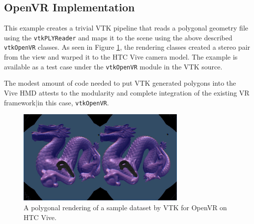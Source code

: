 
\subsection{OpenVR Implementation}

This example creates a trivial VTK pipeline that reads a polygonal geometry file
using the \texttt{vtkPLYReader} and maps it to the scene using the above described \texttt{vtkOpenVR}
classes. As seen in Figure \ref{fig:openvrdragon}, the rendering
classes created a stereo pair from the view and warped it to the HTC Vive camera model. 
The example is available as a test case under the
\texttt{vtkOpenVR} module in the VTK source.

The modest amount of code needed to put VTK generated polygons into the
Vive HMD attests to the modularity and complete integration of the
existing VR framework|in this case, \texttt{vtkOpenVR}.

\begin{figure}[h!]
  \centering
  \includegraphics[width=3.25in]{images/Dragon.jpg}
  \caption{A polygonal rendering of a sample dataset by VTK for OpenVR on HTC Vive.}
  \label{fig:openvrdragon}
\end{figure}
